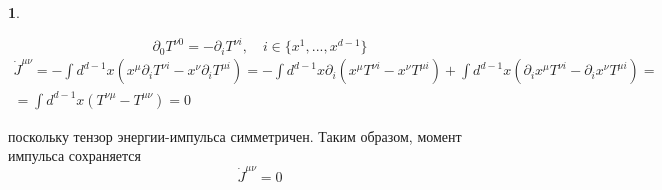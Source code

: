 \documentclass[12pt]{article}
\theoremstyle{definition}
\newtheorem{zad}{}[section]
\begin{document}
\begin{zad}
\begin{enumerate}
    \begin{equation}
        \partial_0T^{\nu0}=-\partial_i T^{\nu i},\quad i\in\{x^1,...,x^{d-1}\}
    \end{equation}
    \begin{multline}
        \dot{J}^{\mu\nu}=-\int d^{d-1}x(x^\mu \partial_i T^{\nu i}-x^\nu\partial_i T^{\mu i})=-\int d^{d-1}x\partial_i(x^\mu T^{\nu i}-x^\nu T^{\mu i})+\int d^{d-1}x(\partial_i x^\mu T^{\nu i}-\partial_i x^\nu T^{\mu i})=\\=\int d^{d-1}x(T^{\nu\mu}- T^{\mu\nu})=0
    \end{multline}
\end{enumerate}
поскольку тензор энергии-импульса симметричен. Таким образом, момент импульса сохраняется
\begin{equation}
    \boxed{\dot{J}^{\mu\nu}=0}
\end{equation}
\end{zad}
\end{document}
